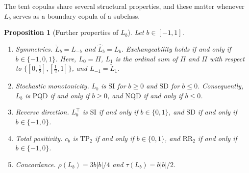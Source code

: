 \documentclass[twocolumn,a4paper]{article}
\numberwithin{equation}{section}
\newtheorem{proposition}[theorem]{Proposition}
\theoremstyle{remark}
\newcommand{\1}{\mathbf{1}}
\newcommand{\PQD}{\mathrm{PQD}}
\newcommand{\NQD}{\mathrm{NQD}}
\newcommand{\SI}{\mathrm{SI}}
\newcommand{\SD}{\mathrm{SD}}
\newcommand{\TPtwo}{\mathrm{TP}_2}
\newcommand{\RRtwo}{\mathrm{RR}_2}
\begin{document}
The tent copulas share several structural properties, and these matter whenever \(L_b\) serves as a boundary copula of a subclass.

\begin{proposition}[Further properties of \(L_b\)]\label{prop:Lb-properties}
Let \(b\in[-1,1]\).
\begin{enumerate}[label=\textup{(\roman*)},leftmargin=*]
\item \emph{Symmetries.} \(\check L_b=L_{-b}\) and \(\widehat L_b=L_b\).
Exchangeability holds if and only if \(b\in\{-1,0,1\}\).
Here, \(L_0=\Pi\), \(L_1\) is the ordinal sum of \(\Pi\) and \(\Pi\) with respect to \(\{[0,\tfrac12],[\tfrac12,1]\}\), and \(L_{-1}=\check L_1\).
\item \emph{Stochastic monotonicity.} \(L_b\) is \(\SI\) for \(b\ge0\) and \(\SD\) for \(b\le0\).
Consequently, \(L_b\) is \(\PQD\) if and only if \(b\ge0\), and \(\NQD\) if and only if \(b\le0\).
\item \emph{Reverse direction.} \(L_b^\top\) is \(\SI\) if and only if \(b\in\{0,1\}\), and \(\SD\) if and only if \(b\in\{-1,0\}\).
\item \emph{Total positivity.} \(c_b\) is \(\TPtwo\) if and only if \(b\in\{0,1\}\), and \(\RRtwo\) if and only if \(b\in\{-1,0\}\).
\item \emph{Concordance.} \(\rho(L_b)=3b|b|/4\) and \(\tau(L_b)=b|b|/2\).
\end{enumerate}
\end{proposition}
\end{document}

